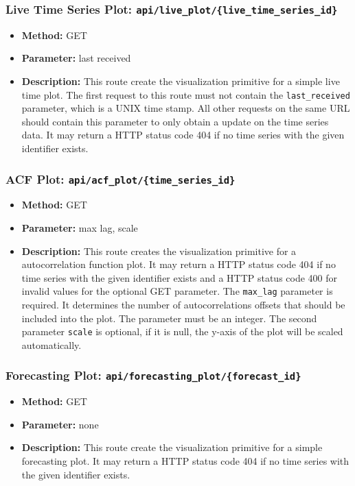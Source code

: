 \documentclass[11pt, a4paper]{article}
\begin{document}
\subsubsection*{Live Time Series Plot: \texttt{api/live\_plot/\{live\_time\_series\_id\}}}
\begin{itemize}
 \item[] \textbf{Method:} GET 
 \item[] \textbf{Parameter:} last received
 \item[] \textbf{Description:} This route create the visualization primitive for a simple live time plot.
 The first request to this route must not contain the \texttt{last\_received} parameter, which is a UNIX time stamp.
 All other requests on the same URL should contain this parameter to only obtain a update on the time series data. 
 It may return a HTTP status code 404 if no time series with the given identifier exists.
\end{itemize}


\subsubsection*{ACF Plot: \texttt{api/acf\_plot/\{time\_series\_id\}}}
\begin{itemize}
 \item[] \textbf{Method:} GET 
 \item[] \textbf{Parameter:} max lag, scale
 \item[] \textbf{Description:} This route creates the visualization primitive for a autocorrelation function plot.
 It may return a HTTP status code 404 if no time series with the given identifier exists and a HTTP status code 400 for invalid values for the optional GET parameter.
 The \texttt{max\_lag} parameter is required. It determines the number of autocorrelations offsets that should be included into the plot.
 The parameter must be an integer.
 The second parameter \texttt{scale} is optional, if it is null, the y-axis of the plot will be scaled automatically.
\end{itemize}


\subsubsection*{Forecasting Plot: \texttt{api/forecasting\_plot/\{forecast\_id\}}}
\begin{itemize}
 \item[] \textbf{Method:} GET 
 \item[] \textbf{Parameter:} none
 \item[] \textbf{Description:} This route create the visualization primitive for a simple forecasting plot.
 It may return a HTTP status code 404 if no time series with the given identifier exists.
\end{itemize}
\end{document}

